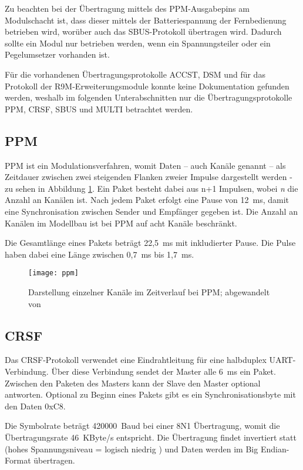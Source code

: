 Zu beachten bei der Übertragung mittels des PPM-Ausgabepins am Modulschacht ist, dass dieser mittels der Batteriespannung der Fernbedienung betrieben wird, worüber auch das SBUS-Protokoll übertragen wird. Dadurch sollte ein Modul nur betrieben werden, wenn ein Spannungsteiler oder ein Pegelumsetzer vorhanden ist. \cite{opentxFAQ}

Für die vorhandenen Übertragungsprotokolle ACCST, DSM und für das Protokoll der R9M-Erweiterungsmodule konnte keine Dokumentation gefunden werden, weshalb im folgenden Unterabschnitten nur die Übertragungsprotokolle \ac{PPM}, CRSF, SBUS und MULTI betrachtet werden.

\subsection{\acf{PPM}}
\ac{PPM} ist ein Modulationsverfahren, womit Daten -- auch Kanäle genannt -- als Zeitdauer zwischen zwei steigenden Flanken zweier Impulse dargestellt werden - zu sehen in Abbildung \ref{fig:ppmtime}. Ein Paket besteht dabei aus n+1 Impulsen, wobei \textit{n} die Anzahl an Kanälen ist. Nach jedem Paket erfolgt eine Pause von 12~ms, damit eine Synchronisation zwischen Sender und Empfänger gegeben ist. Die Anzahl an Kanälen im Modellbau ist bei \ac{PPM} auf acht Kanäle beschränkt. \cite{hornppm}

Die Gesamtlänge eines Pakets beträgt 22,5~ms mit inkludierter Pause. Die Pulse haben dabei eine Länge zwischen 0,7~ms bis 1,7~ms. \cite{opentxppm}

\begin{figure}[H]
    \centering
    \texttt{[image: ppm]}
    \caption{Darstellung einzelner Kanäle im Zeitverlauf bei \acs{PPM}; abgewandelt von \cite{hornppm}}
    \label{fig:ppmtime}
\end{figure}

\subsection{CRSF}
Das CRSF-Protokoll verwendet eine Eindrahtleitung für eine halbduplex \ac{UART}-Verbindung. Über diese Verbindung sendet der Master alle 6~ms ein Paket. Zwischen den Paketen des Masters kann der Slave den Master optional antworten. Optional zu Beginn eines Pakets gibt es ein Synchronisationsbyte mit den Daten 0xC8. \cites{cleanflightCrsf}{cleanflightCrsfP}

Die Symbolrate beträgt 420000~Baud bei einer 8N1 Übertragung, womit die Übertragungsrate 46~KByte/s entspricht. Die Übertragung findet invertiert statt (hohes Spannungsniveau = logisch niedrig \cite{sigrokSBus}) und Daten werden im Big Endian-Format übertragen. \cite{cleanflightCrsf}

